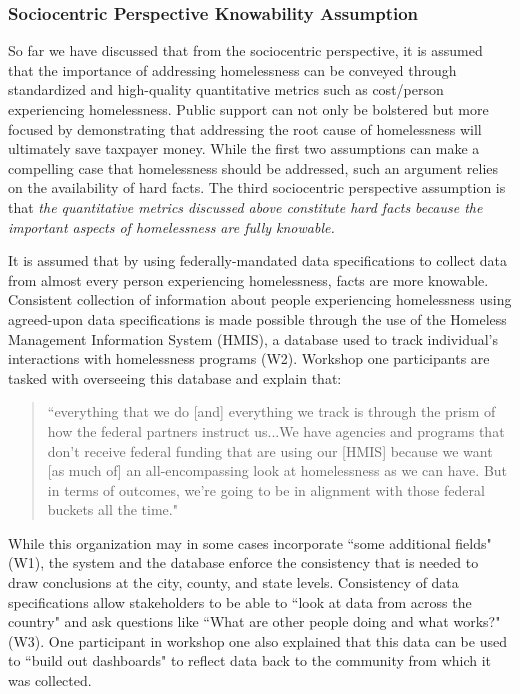 \subsubsection{Sociocentric Perspective Knowability Assumption}

So far we have discussed that from the sociocentric perspective, it is assumed that the importance of addressing homelessness can be conveyed through standardized and high-quality quantitative metrics such as cost/person experiencing homelessness. Public support can not only be bolstered but more focused by demonstrating that addressing the root cause of homelessness will ultimately save taxpayer money. While the first two assumptions can make a compelling case that homelessness should be addressed, such an argument relies on the availability of hard facts. The third sociocentric perspective assumption is that \textit{the quantitative metrics discussed above constitute hard facts because the important aspects of homelessness are fully knowable.}

It is assumed that by using federally-mandated data specifications to collect data from almost every person experiencing homelessness, facts are more knowable. Consistent collection of information about people experiencing homelessness using agreed-upon data specifications is made possible through the use of the Homeless Management Information System (HMIS), a database used to track individual's interactions with homelessness programs (W2). Workshop one participants are tasked with overseeing this database and explain that:

\begin{quote}\singlespacing ``everything that we do [and] everything we track is through the prism of how the federal partners instruct us...We have agencies and programs that don't receive federal funding that are using our [HMIS] because we want [as much of] an all-encompassing look at homelessness as we can have. But in terms of outcomes, we're going to be in alignment with those federal buckets all the time." \end{quote}

While this organization may in some cases incorporate ``some additional fields" (W1), the system and the database enforce the consistency that is needed to draw conclusions at the city, county, and state levels. Consistency of data specifications allow stakeholders to be able to ``look at data from across the country" and ask questions like ``What are other people doing and what works?" (W3). One participant in workshop one also explained that this data can be used to ``build out dashboards" to reflect data back to the community from which it was collected.

